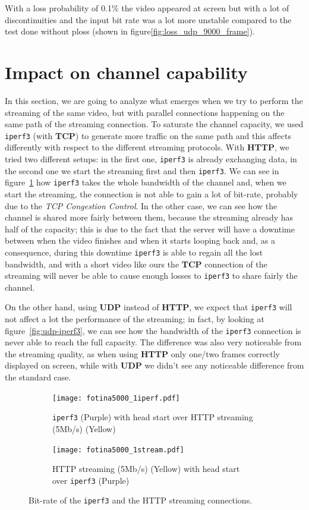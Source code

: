 \documentclass{exam}
\begin{document}
With a loss probability of 0.1\% the video appeared at screen but with a lot of discontinuities and the input bit rate was a lot more unstable compared to the test done without ploss (shown in figure\ref{fig:loss_udp_9000_frame}).



\section{Impact on channel capability}
In this section, we are going to analyze what emerges when we try to perform the streaming of the same video, but with parallel connections happening on the same path of the streaming connection. To saturate the channel capacity, we used \texttt{iperf3} (with \textbf{TCP}) to generate more traffic on the same path and this affects differently with respect to the different streaming protocols. With \textbf{HTTP}, we tried two different setups: in the first one, \texttt{iperf3} is already exchanging data, in the second one we start the streaming first and then \texttt{iperf3}. We can see in figure~\ref{fig:http-iperf3} how \texttt{iperf3} takes the whole bandwidth of the channel and, when we start the streaming, the connection is not able to gain a lot of bit-rate, probably due to the \textit{TCP Congestion Control}. In the other case, we can see how the channel is shared more fairly between them, because the streaming already has half of the capacity; this is due to the fact that the server will have a downtime between when the video finishes and when it starts looping back and, as a consequence, during this downtime \texttt{iperf3} is able to regain all the lost bandwidth, and with a short video like ours the \textbf{TCP} connection of the streaming will never be able to cause enough losses to \texttt{iperf3} to share fairly the channel.

On the other hand, using \textbf{UDP} instead of \textbf{HTTP}, we expect that \texttt{iperf3} will not affect a lot the performance of the streaming; in fact, by looking at figure~\ref{fig:udp-iperf3}, we can see how the bandwidth of the \texttt{iperf3} connection is never able to reach the full capacity. The difference was also very noticeable from the streaming quality, as when using \textbf{HTTP} only one/two frames correctly displayed on screen, while with \textbf{UDP} we didn't see any noticeable difference from the standard case.

\begin{figure}[h]
    \centering
    \begin{subfigure}{0.45\textwidth}
        \centering
        \texttt{[image: fotina5000\_1iperf.pdf]}
        \caption{\texttt{iperf3} (Purple)  with head start over HTTP streaming (5Mb/s) (Yellow)}
    \end{subfigure}
    \hfill
    \begin{subfigure}{0.45\textwidth}
        \centering
        \texttt{[image: fotina5000\_1stream.pdf]}
        \caption{HTTP streaming (5Mb/s) (Yellow) with head start over \texttt{iperf3} (Purple)}
    \end{subfigure}
    \caption{Bit-rate of the \texttt{iperf3}  and the HTTP streaming connections.}
    \label{fig:http-iperf3}
\end{figure}
\end{document}
